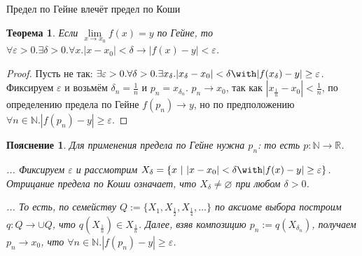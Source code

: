 \documentclass[aspectratio=169]{beamer}
\newtheorem{thm}{Теорема}[section]
\newtheorem{snote}{Пояснение}[section]
\begin{document}
\begin{frame}{Предел по Гейне влечёт предел по Коши}
\begin{thm}
Если $\lim\limits_{x \rightarrow x_0}f(x) = y$ по Гейне, то
$\forall \varepsilon>0.\exists \delta>0.\forall x.|x-x_0|<\delta \rightarrow |f(x)-y| < \varepsilon$.
\end{thm}

\begin{proof}
Пусть не так:
$\exists \varepsilon>0.\forall \delta>0.\exists x_\delta.|x_\delta-x_0|<\delta \with |f(x_\delta)-y| \ge \varepsilon$.
Фиксируем $\varepsilon$ и возьмём $\delta_n = \frac{1}{n}$ и $p_n = x_{\delta_n}$. 
$p_n \rightarrow x_0$, так как $|x_\frac{1}{n} - x_0| < \frac{1}{n}$, 
по определению предела по Гейне $f(p_n) \rightarrow y$, 
но по предположению $\forall n\in\mathbb{N}.|f(p_n) - y| \ge \varepsilon$.
\end{proof}\pause

\begin{snote}
Для применения предела по Гейне нужна $p_n$: то есть $p: \mathbb{N}\rightarrow\mathbb{R}$.
\pause

... %
Фиксируем $\varepsilon$ и рассмотрим $X_\delta = \{ x \ |\ |x-x_0| <\delta \with |f(x)-y| \ge \varepsilon\}$.
Отрицание предела по Коши означает, что $X_\delta \ne \varnothing$ при любом $\delta > 0$.
\pause

... То есть, по семейству $Q:=\{ X_1, X_\frac{1}{2}, X_\frac{1}{4}, \dots \}$ 
по аксиоме выбора построим $q: Q \rightarrow \cup Q$, что $q(X_\frac{1}{n}) \in X_\frac{1}{n}$.
Далее, взяв композицию $p_n := q(X_{\delta_n})$, получаем $p_n \rightarrow x_0$, что $\forall n\in\mathbb{N}.|f(p_n) - y| \ge \varepsilon$.
\end{snote}
\end{frame}
\end{document}
